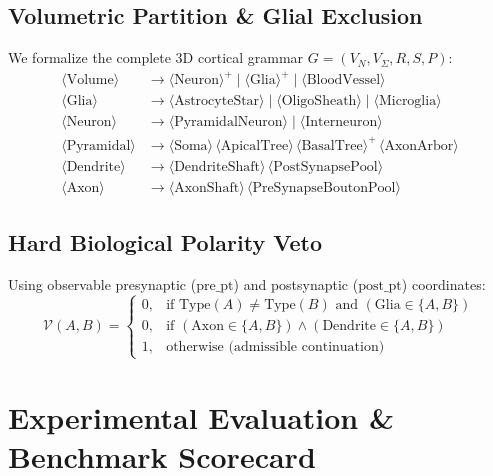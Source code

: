 \documentclass[10pt,twocolumn,letterpaper]{article}
\begin{document}
\subsection{Volumetric Partition \& Glial Exclusion}
We formalize the complete 3D cortical grammar $G = (V_N, V_{\Sigma}, R, S, P)$:
\begin{align}
\langle \text{Volume} \rangle &\to \langle \text{Neuron} \rangle^+ \mid \langle \text{Glia} \rangle^+ \mid \langle \text{BloodVessel} \rangle \label{eq:p1} \\
\langle \text{Glia} \rangle &\to \langle \text{AstrocyteStar} \rangle \mid \langle \text{OligoSheath} \rangle \mid \langle \text{Microglia} \rangle \label{eq:p2} \\
\langle \text{Neuron} \rangle &\to \langle \text{PyramidalNeuron} \rangle \mid \langle \text{Interneuron} \rangle \label{eq:p3} \\
\langle \text{Pyramidal} \rangle &\to \langle \text{Soma} \rangle \, \langle \text{ApicalTree} \rangle \, \langle \text{BasalTree} \rangle^+ \, \langle \text{AxonArbor} \rangle \label{eq:p4} \\
\langle \text{Dendrite} \rangle &\to \langle \text{DendriteShaft} \rangle \, \langle \text{PostSynapsePool} \rangle \label{eq:p5} \\
\langle \text{Axon} \rangle &\to \langle \text{AxonShaft} \rangle \, \langle \text{PreSynapseBoutonPool} \rangle \label{eq:p6}
\end{align}

\subsection{Hard Biological Polarity Veto}
Using observable presynaptic ($\text{pre\_pt}$) and postsynaptic ($\text{post\_pt}$) coordinates:
\begin{equation}
\mathcal{V}(A, B) = 
\begin{cases}
0, & \text{if } \text{Type}(A) \ne \text{Type}(B) \text{ and } (\text{Glia} \in \{A, B\}) \\
0, & \text{if } (\text{Axon} \in \{A, B\}) \land (\text{Dendrite} \in \{A, B\}) \\
1, & \text{otherwise (admissible continuation)}
\end{cases}
\end{equation}

\section{Experimental Evaluation \& Benchmark Scorecard}
\end{document}
